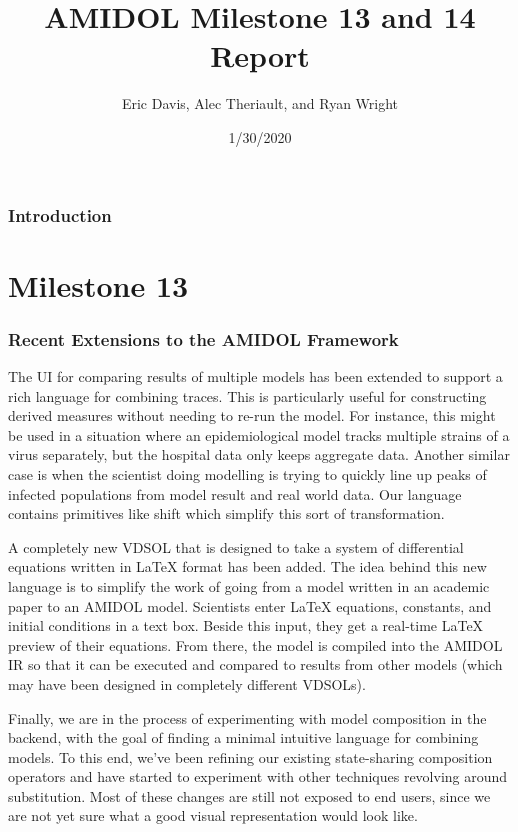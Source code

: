 \documentclass[12pt]{galois-whitepaper}
\author{Eric Davis, Alec Theriault, and Ryan Wright}
\title{AMIDOL Milestone 13 and 14 Report}
\date{1/30/2020}
\begin{document}
\maketitle

\vspace*{2cm}
\tableofcontents

\section{Introduction}

\part{Milestone 13}

\section{Recent Extensions to the AMIDOL Framework}

The UI for comparing results of multiple models has been extended to support a rich language for combining traces. This is particularly useful for constructing derived measures without needing to re-run the model. For instance, this might be used in a situation where an epidemiological model tracks multiple strains of a virus separately, but the hospital data only keeps aggregate data. Another similar case is when the scientist doing modelling is trying to quickly line up peaks of infected populations from model result and real world data. Our language contains primitives like shift which simplify this sort of transformation.

A completely new VDSOL that is designed to take a system of
differential equations written in LaTeX format has been added. The
idea behind this new language is to simplify the work of going from a
model written in an academic paper to an AMIDOL model. Scientists
enter LaTeX equations, constants, and initial conditions in a text
box. Beside this input, they get a real-time LaTeX preview of their
equations. From there, the model is compiled into the AMIDOL IR so
that it can be executed and compared to results from other models
(which may have been designed in completely different VDSOLs).

Finally, we are in the process of experimenting with model composition in the backend, with the goal of finding a minimal intuitive language for combining models. To this end, we’ve been refining our existing state-sharing composition operators and have started to experiment with other techniques revolving around substitution. Most of these changes are still not exposed to end users, since we are not yet sure what a good visual representation would look like.
\end{document}
